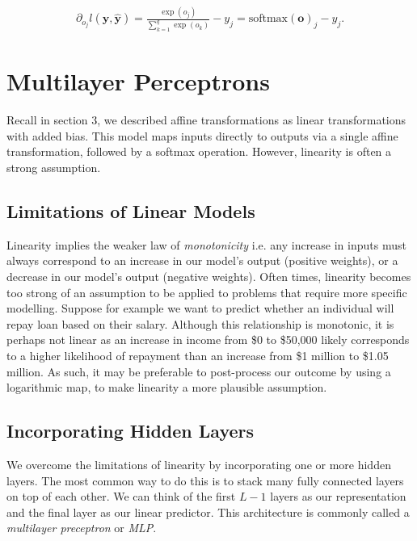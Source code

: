 \documentclass[a4paper,12pt]{article}
\theoremstyle{definition}
\begin{document}
\begin{align*}
    \partial_{o_j} l(\mathbf{y}, \hat{\mathbf{y}}) = \frac{\exp(o_j)}{\sum_{k=1}^q \exp(o_k)} - y_j = \mathrm{softmax}(\mathbf{o})_j - y_j.
\end{align*}

\section{Multilayer Perceptrons}
Recall in section 3, we described affine transformations as linear transformations with added bias. This model maps inputs directly to
outputs via a single affine transformation, followed by a softmax operation. However, linearity is often a strong assumption.
\subsection*{Limitations of Linear Models}
Linearity implies the weaker law of \textit{monotonicity} i.e. any increase in inputs must always correspond to an increase in our model's
output (positive weights), or a decrease in our model's output (negative weights). Often times, linearity becomes too strong of an assumption
to be applied to problems that require more specific modelling. Suppose for example we want to predict whether an individual will repay loan
based on their salary. Although this relationship is monotonic, it is perhaps not linear as an increase in income from \$0 to \$50,000 likely
corresponds to a higher likelihood of repayment than an increase from \$1 million to \$1.05 million. As such, it may be preferable to
post-process our outcome by using a logarithmic map, to make linearity a more plausible assumption.
\subsection*{Incorporating Hidden Layers}
We overcome the limitations of linearity by incorporating one or more hidden layers. The most common way to do this is to stack many fully
connected layers on top of each other. We can think of the first $L-1$ layers as our representation and the final layer as our linear predictor.
This architecture is commonly called a \textit{multilayer preceptron} or \textit{MLP}.
\end{document}
